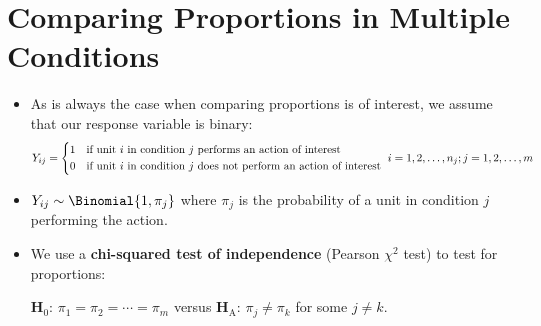 \section{Comparing Proportions in Multiple Conditions}
\begin{itemize}
    \item As is always the case when comparing proportions is of interest, we assume that our response variable
          is binary:
          \[ Y_{ij}=\begin{cases*}
                  1 & if unit $ i $ in condition $ j $ performs an action of interest         \\
                  0 & if unit $ i $ in condition $ j $ does not perform an action of interest
              \end{cases*}i=1,2,\ldots,n_j;j=1,2,\ldots,m \]
    \item $ Y_{ij}\sim \Binomial{1,\pi_j} $
          where $ \pi_j $ is the probability of a unit in condition $ j $ performing the action.
    \item We use a \textbf{chi-squared test of independence} (Pearson $ \chi^2 $ test) to test for proportions:
          \begin{tightcenter}
              $ \mathbf{H}_0 $: $ \pi_1=\pi_2=\cdots=\pi_m $ versus $ \mathbf{H}_\text{A} $: $ \pi_j\ne \pi_k $ for some $ j\ne k $.
          \end{tightcenter}
\end{itemize}
